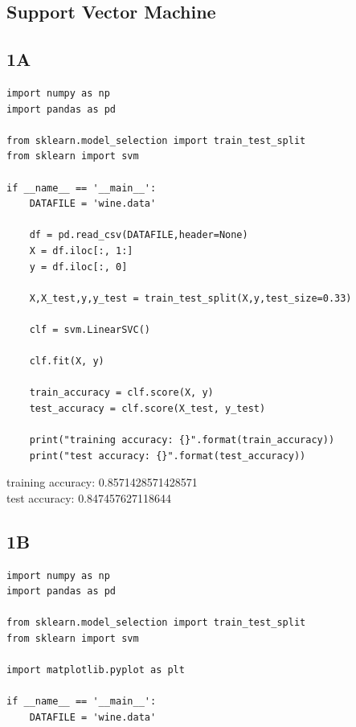 \documentclass[12pt]{article}
\begin{document}
	\maketitle
	
	\begin{flushleft}
		\section{Support Vector Machine}
		
		\subsection*{1A}
		
			\begin{lstlisting}
import numpy as np 
import pandas as pd

from sklearn.model_selection import train_test_split
from sklearn import svm

if __name__ == '__main__':
	DATAFILE = 'wine.data'
	
	df = pd.read_csv(DATAFILE,header=None)
	X = df.iloc[:, 1:]
	y = df.iloc[:, 0]
	
	X,X_test,y,y_test = train_test_split(X,y,test_size=0.33)
	
	clf = svm.LinearSVC()
	
	clf.fit(X, y)
	
	train_accuracy = clf.score(X, y)
	test_accuracy = clf.score(X_test, y_test)
	
	print("training accuracy: {}".format(train_accuracy))
	print("test accuracy: {}".format(test_accuracy))
			\end{lstlisting}
				
				training accuracy: 0.8571428571428571\\
				test accuracy: 0.847457627118644\\
		
		\subsection*{1B}
		
			\begin{lstlisting}
import numpy as np 
import pandas as pd

from sklearn.model_selection import train_test_split
from sklearn import svm

import matplotlib.pyplot as plt

if __name__ == '__main__':
	DATAFILE = 'wine.data'
	

\end{lstlisting}
\end{flushleft}
\end{document}
